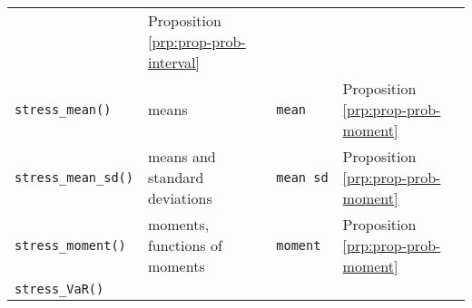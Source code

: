 \documentclass[]{article}
\theoremstyle{definition}
\theoremstyle{definition}
\theoremstyle{definition}
\theoremstyle{remark}
\begin{document}
\begin{longtable}[]{@{}llll@{}}
\begin{minipage}[t]{0.09\columnwidth}
\end{minipage} & \begin{minipage}[t]{0.19\columnwidth}\raggedright
Proposition \ref{prp:prop-prob-interval}\strut
\end{minipage}\tabularnewline
\begin{minipage}[t]{0.22\columnwidth}\raggedright
\texttt{stress\_mean()}\strut
\end{minipage} & \begin{minipage}[t]{0.38\columnwidth}\raggedright
means\strut
\end{minipage} & \begin{minipage}[t]{0.09\columnwidth}\raggedright
\texttt{mean}\strut
\end{minipage} & \begin{minipage}[t]{0.19\columnwidth}\raggedright
Proposition \ref{prp:prop-prob-moment}\strut
\end{minipage}\tabularnewline
\begin{minipage}[t]{0.22\columnwidth}\raggedright
\texttt{stress\_mean\_sd()}\strut
\end{minipage} & \begin{minipage}[t]{0.38\columnwidth}\raggedright
means and standard deviations\strut
\end{minipage} & \begin{minipage}[t]{0.09\columnwidth}\raggedright
\texttt{mean\ sd}\strut
\end{minipage} & \begin{minipage}[t]{0.19\columnwidth}\raggedright
Proposition \ref{prp:prop-prob-moment}\strut
\end{minipage}\tabularnewline
\begin{minipage}[t]{0.22\columnwidth}\raggedright
\texttt{stress\_moment()}\strut
\end{minipage} & \begin{minipage}[t]{0.38\columnwidth}\raggedright
moments, functions of moments\strut
\end{minipage} & \begin{minipage}[t]{0.09\columnwidth}\raggedright
\texttt{moment}\strut
\end{minipage} & \begin{minipage}[t]{0.19\columnwidth}\raggedright
Proposition \ref{prp:prop-prob-moment}\strut
\end{minipage}\tabularnewline
\begin{minipage}[t]{0.22\columnwidth}\raggedright
\texttt{stress\_VaR()}\strut
\end{minipage} & \begin{minipage}[t]{0.38\columnwidth}\raggedright

\end{minipage}
\end{longtable}
\end{document}
